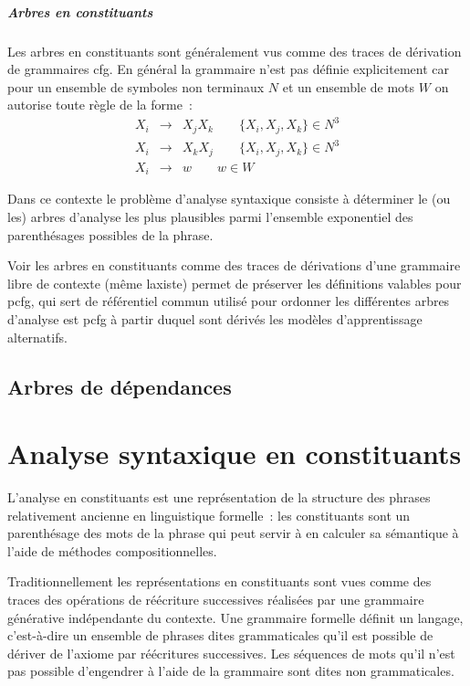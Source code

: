 \documentclass[11pt,openany]{book}
\newcommand{\ac}[1]{{\sc #1}} %
\begin{document}
\paragraph{Arbres en constituants} Les arbres en constituants sont généralement vus comme des traces de dérivation de grammaires \ac{cfg}.
En général la grammaire n'est pas définie explicitement car pour un ensemble de symboles non terminaux $N$ et un ensemble 
de mots $W$ on autorise toute règle de la forme~:
\begin{eqnarray*}
X_i &\rightarrow &X_j X_k \qquad \{X_i,X_j,X_k\} \in N^3\\
X_i &\rightarrow &X_k X_j \qquad \{X_i,X_j,X_k\} \in N^3\\
X_i & \rightarrow & w       \qquad w \in W
\end{eqnarray*}

Dans ce contexte le problème d'analyse syntaxique consiste à déterminer le (ou les) arbres d'analyse 
les plus plausibles parmi l'ensemble exponentiel des parenthésages possibles de la phrase.

Voir les arbres en constituants comme des traces de dérivations d'une grammaire libre de contexte (même laxiste) permet de préserver les définitions valables pour \ac{pcfg},
qui sert de référentiel commun utilisé pour ordonner les différentes arbres d'analyse est {\sc pcfg} à partir duquel sont dérivés les modèles d'apprentissage alternatifs.











\section{Arbres de dépendances}






\chapter{Analyse syntaxique en constituants}


L'analyse en constituants est une représentation de la structure des phrases relativement 
ancienne en linguistique formelle~: les constituants sont  un parenthésage des mots de la phrase 
qui peut servir à en calculer sa sémantique à l'aide de méthodes compositionnelles.

Traditionnellement les représentations en constituants sont vues comme des traces des opérations de réécriture successives 
réalisées par une grammaire générative indépendante du contexte. 
Une grammaire formelle définit un langage,  c'est-à-dire un ensemble de phrases dites grammaticales qu'il est possible de dériver de l'axiome 
par réécritures successives. Les séquences de mots qu'il n'est pas possible d'engendrer à l'aide de la grammaire sont dites non grammaticales.
\end{document}
